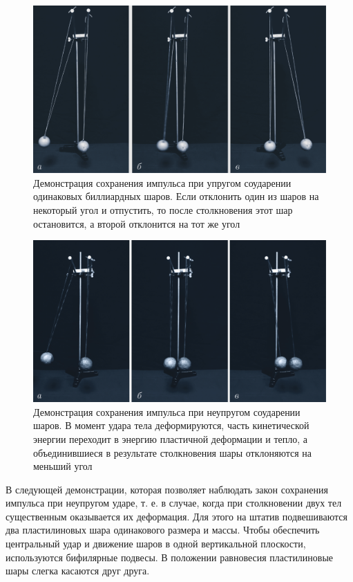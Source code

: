 \documentclass[All.tex]{subfiles}
\begin{document}
	\begin{figure}[H]
			\centering	
			\includegraphics[width=0.9\linewidth]{hit-2.png}
			\caption{Демонстрация сохранения импульса при упругом соударении одинаковых биллиардных шаров. Если отклонить один из шаров на некоторый угол и отпустить, то после столкновения этот шар остановится, а второй отклонится на тот же угол}
			\label{hit-2}
		\end{figure}

	\begin{figure}[H]
	\centering	
	\includegraphics[width=0.9\linewidth]{hit-3.png}
	\caption{Демонстрация сохранения импульса при неупругом соударении шаров. В момент удара тела деформируются, часть кинетической энергии переходит в энергию пластичной деформации и тепло, а объединившиеся в результате столкновения шары отклоняются на меньший угол}
	\label{hit-3}
\end{figure}

В следующей демонстрации, которая позволяет наблюдать закон сохранения импульса при неупругом ударе, т. е. в случае, когда при столкновении двух тел существенным оказывается их деформация. Для этого на штатив подвешиваются два пластилиновых шара одинакового размера и массы. Чтобы обеспечить центральный удар и движение шаров в одной вертикальной плоскости, используются бифилярные подвесы.
В положении равновесия пластилиновые шары слегка касаются друг друга.
\end{document}
